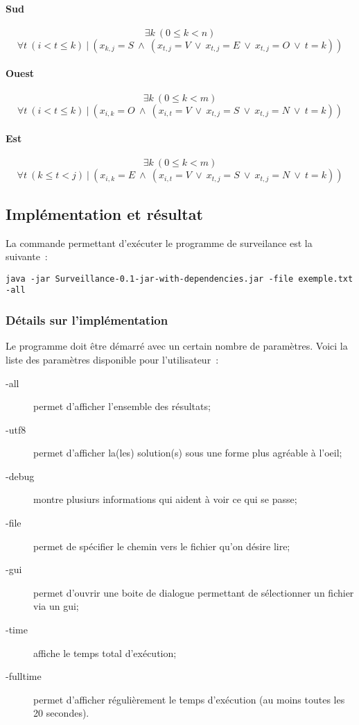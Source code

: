 \documentclass[a4paper,11pt]{article}
\newcommand{\AND}{~\wedge~}
\newcommand{\OR}{~\vee~}
\newcommand{\TQ}{~|~}
\begin{document}
          \paragraph{Sud}
              \[ \exists k~(0 \leq k < n) \]
              \[ \forall t~(i < t \leq k) \TQ (x_{k, j} = S \AND (x_{t, j} = V \OR x_{t, j} = E \OR x_{t, j} = O \OR t = k)) \]

          \paragraph{Ouest}
              \[ \exists k~(0 \leq k < m) \]
              \[ \forall t~(i < t \leq k) \TQ (x_{i, k} = O \AND (x_{i, t} = V \OR x_{t, j} = S \OR x_{t, j} = N \OR t = k)) \]

          \paragraph{Est}
              \[ \exists k~(0 \leq k < m) \]
              \[ \forall t~(k \leq t < j) \TQ (x_{i, k} = E \AND (x_{i, t} = V \OR x_{t, j} = S \OR x_{t, j} = N \OR t = k)) \]
    
    \subsection{Implémentation et résultat}
    
        La commande permettant d'exécuter le programme de surveilance est la suivante~:
        \begin{verbatim}
java -jar Surveillance-0.1-jar-with-dependencies.jar -file exemple.txt -all
        \end{verbatim}
        \subsubsection{Détails sur l'implémentation}
            Le programme doit être démarré avec un certain nombre de paramètres. Voici la liste des paramètres disponible pour l'utilisateur~:
            \begin{description}
              \item[-all] permet d'afficher l'ensemble des résultats;
              \item[-utf8] permet d'afficher la(les) solution(s) sous une forme plus agréable à l'oeil;
              \item[-debug] montre plusiurs informations qui aident à voir ce qui se passe;
              \item[-file] permet de spécifier le chemin vers le fichier qu'on désire lire;
              \item[-gui] permet d'ouvrir une boite de dialogue permettant de sélectionner un fichier via un gui;
              \item[-time] affiche le temps total d'exécution;
              \item[-fulltime] permet d'afficher régulièrement le temps d'exécution (au moins toutes les 20 secondes).
        \end{description}
            
\end{document}
